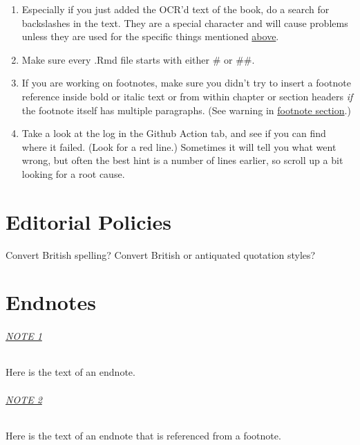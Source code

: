 \documentclass[
]{book}
\providecommand{\tightlist}{%
  \setlength{\itemsep}{0pt}\setlength{\parskip}{0pt}}
\begin{document}
\begin{enumerate}
\def\labelenumi{\arabic{enumi}.}
\tightlist
\item
  Especially if you just added the OCR'd text of the book, do a search for backslashes in the text. They are a special character and will cause problems unless they are used for the specific things mentioned \protect\hyperlink{backslashes}{above}.
\item
  Make sure every .Rmd file starts with either \# or \#\#.
\item
  If you are working on footnotes, make sure you didn't try to insert a footnote reference inside bold or italic text or from within chapter or section headers \emph{if} the footnote itself has multiple paragraphs. (See warning in \protect\hyperlink{footnotes}{footnote section}.)
\item
  Take a look at the log in the Github Action tab, and see if you can find where it failed. (Look for a red line.) Sometimes it will tell you what went wrong, but often the best hint is a number of lines earlier, so scroll up a bit looking for a root cause.
\end{enumerate}

\hypertarget{editorial-policies}{%
\chapter{Editorial Policies}\label{editorial-policies}}

Convert British spelling?
Convert British or antiquated quotation styles?

\hypertarget{endnotes-1}{%
\chapter*{Endnotes}\label{endnotes-1}}

\hypertarget{en.01}{%
\subparagraph*{\texorpdfstring{\protect\hyperlink{en.01.backlink}{NOTE 1}}{NOTE 1}}\label{en.01}}

Here is the text of an endnote.

\hypertarget{en.02}{%
\subparagraph*{\texorpdfstring{\protect\hyperlink{en.02.backlink}{NOTE 2}}{NOTE 2}}\label{en.02}}

Here is the text of an endnote that is referenced from a footnote.
\end{document}
